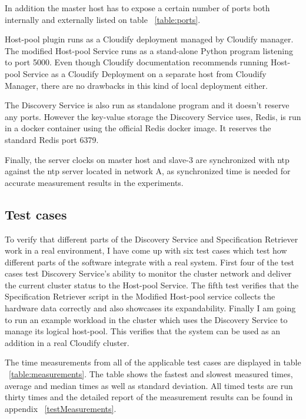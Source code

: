 In addition the master host has to expose a certain number of ports both internally and externally listed on table ~\ref{table:ports}.

Host-pool plugin runs as a Cloudify deployment managed by Cloudify manager. The modified Host-pool Service runs as a stand-alone Python program listening to port 5000. Even though Cloudify documentation recommends running Host-pool Service as a Cloudify Deployment on a separate host from Cloudify Manager, there are no drawbacks in this kind of local deployment either. 

The Discovery Service is also run as standalone program and it doesn't reserve any ports. However the key-value storage the Discovery Service uses, Redis, is run in a docker container using the official Redis docker image. It reserves the standard  Redis port 6379.

Finally, the server clocks on master host and slave-3 are synchronized with ntp against the ntp server located in network A, as synchronized time is needed for accurate measurement results in the experiments.
  

\subsection{Test cases}

To verify that different parts of the Discovery Service and Specification Retriever work in a real environment, I have come up with six test cases which test how different parts of the software integrate with a real system. First four of the test cases test Discovery Service's ability to monitor  the cluster network and deliver the current cluster status to the Host-pool Service. The fifth test verifies that the Specification Retriever script in the Modified Host-pool service collects the hardware data correctly and also showcases its expandability. Finally I am going to run an example workload in the cluster which uses the Discovery Service to manage its logical host-pool. This verifies that the system can be used as an addition in a real Cloudify cluster.

The time measurements from all of the applicable test cases are displayed in table ~\ref{table:measurements}. The table shows the fastest and slowest measured times, average and median times as well as standard deviation. All timed tests are run thirty times and the detailed report of the measurement results can be found in appendix ~\ref{testMeasurements}.

